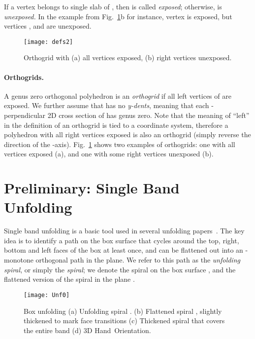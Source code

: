 \documentclass[11pt]{article}
\newcommand\hand{{\sc Hand}}
\begin{document}
If a vertex  belongs to single slab of , then  is called \emph{exposed}; otherwise,  is \emph{unexposed.} In the example from Fig.~\ref{fig:defs2}b for instance, vertex  is exposed, but vertices ,  and  are unexposed.
\begin{figure}[htbp]
\centering
\texttt{[image: defs2]}
\caption{Orthogrid with (a) all vertices exposed, (b) right vertices  unexposed.}
\label{fig:defs2}
\end{figure}


\paragraph{Orthogrids.} A genus zero orthogonal polyhedron  is an \emph{orthogrid} if all left vertices of  are exposed. We further assume that  has no \emph{y-dents}, meaning that each -perpendicular 2D cross section of  has genus zero. 
Note that the meaning of ``left'' in the definition of an orthogrid is tied to a coordinate system,  therefore a polyhedron with all right vertices exposed  is also an orthogrid (simply reverse the direction of the -axis). Fig.~\ref{fig:defs2} shows two examples of orthogrids: one with all vertices exposed (a), and one with some right vertices unexposed (b). 



\section{Preliminary: Single Band Unfolding}
\label{sec:boxunf}
Single band unfolding is a basic tool used in several unfolding papers~\cite{Damian-Flatland-O'Rourke-2007-epsilon, Damian-Flatland-O'Rourke-2008-manhattan, Damian-Demaine-Flatland-2012-epsilon}. 
The key idea is to identify a path on the box surface that cycles around the top, right, bottom and left faces of the box at least once, and can be flattened out into an -monotone orthogonal path in the plane. We refer to this path as the \emph{unfolding spiral}, or simply the \emph{spiral}; we denote the spiral on the box surface , and the flattened version of the spiral in the plane .

\begin{figure}[htbp]
\centering
\texttt{[image: Unf0]}
\caption{Box unfolding (a) Unfolding spiral .
(b) Flattened spiral , slightly thickened to mark face transitions (c) Thickened spiral that covers the entire band (d) 3D \hand\ Orientation.}
\label{fig:Unf0}
\end{figure}
\end{document}
